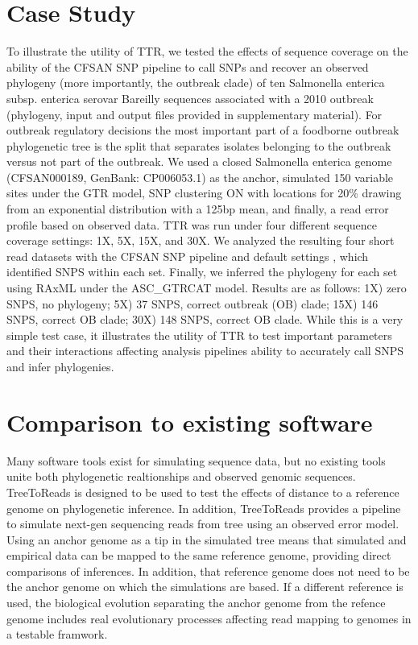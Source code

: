 \section{Case Study}
To illustrate the utility of TTR, we tested the effects of sequence coverage on the ability of the CFSAN SNP pipeline \citep{davis_cfsan_2015} 
to call SNPs and recover an observed phylogeny (more importantly, the outbreak clade) of ten Salmonella enterica subsp. enterica serovar Bareilly sequences 
associated with a 2010 outbreak \citep{hoffmann_tracing_2015} (phylogeny, input and output files provided in supplementary material). 
For outbreak regulatory decisions the most important part of a foodborne outbreak phylogenetic tree is the split that separates isolates belonging to the outbreak versus not part of the outbreak. 
We used a closed Salmonella enterica genome (CFSAN000189, GenBank: CP006053.1) as the anchor, simulated 150 variable sites under the GTR model, 
SNP clustering ON with locations for 20\% drawing from an exponential distribution with a 125bp mean, and finally, a read error profile based on observed data. 
TTR was run under four different sequence coverage settings: 1X, 5X, 15X, and 30X. 
We analyzed the resulting four short read datasets with the CFSAN SNP pipeline and default settings \citep{davis_cfsan_2015}, 
which identified SNPS within each set. 
Finally, we inferred the phylogeny for each set using RAxML \citep{stamatakis_raxml_2014} under the ASC\_GTRCAT model.  
Results are as follows: 1X) zero SNPS, no phylogeny; 5X) 37 SNPS, correct outbreak (OB) clade; 15X) 146 SNPS, correct OB clade; 30X) 148 SNPS, correct OB clade.  
While this is a very simple test case, it illustrates the utility of TTR to test important parameters and their interactions affecting analysis pipelines ability to accurately call SNPS and infer phylogenies.

\section*{Comparison to existing software}
Many software tools exist for simulating sequence data,
but no existing tools unite both phylogenetic realtionships and observed genomic sequences.
TreeToReads is designed to be used to test the effects of distance to a  reference genome on phylogenetic inference.
In addition, TreeToReads provides a pipeline to simulate next-gen sequencing reads from tree using an observed error model.
Using an anchor genome as a tip in the simulated tree means that simulated and empirical data can be mapped to the same reference genome,
providing direct comparisons of inferences.
In addition, that reference genome does not need to be the anchor genome on which the simulations are based.
If a different reference is used, the biological evolution separating the anchor genome from the refence genome 
includes real evolutionary processes affecting read mapping to genomes in a testable framwork. %

